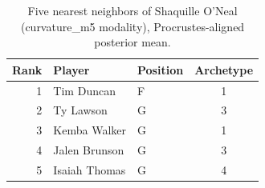\begin{table}[htbp]
  \centering\small
  \begin{tabular}{rllc}
    \toprule
    Rank & Player & Position & Archetype \\
    \midrule
    1 & Tim Duncan & F & 1 \\
    2 & Ty Lawson & G & 3 \\
    3 & Kemba Walker & G & 1 \\
    4 & Jalen Brunson & G & 3 \\
    5 & Isaiah Thomas & G & 4 \\
    \bottomrule
  \end{tabular}
  \caption{Five nearest neighbors of Shaquille O'Neal (curvature_m5 modality), Procrustes-aligned posterior mean.}
  \label{tab:Shaquille_O_Neal_neighbors_curvature_m5}
\end{table}


